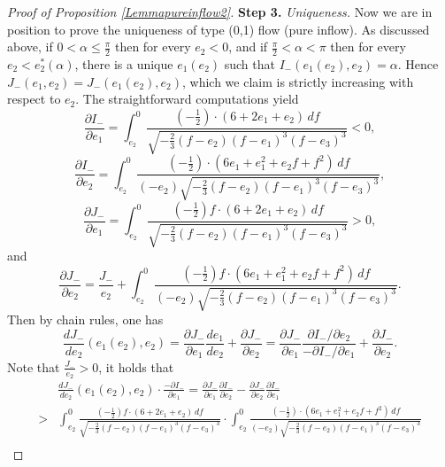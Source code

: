 \documentclass[reqno,12pt]{amsart}
\begin{document}
\begin{proof}[Proof of Proposition \ref{Lemmapureinflow2}]
{\bf Step 3.} {\it Uniqueness.}  Now we are in position to  prove the uniqueness of type (0,1) flow (pure inflow). As discussed above, if $0< \alpha \leq \frac{\pi}{2}$ then for every $e_2<0$, and if $\frac{\pi}{2} < \alpha< \pi$ then for every $e_2<e_2^*(\alpha)$, there is a unique $e_1(e_2)$ such that $I_{-}(e_1(e_2), e_2) = \alpha$. Hence $J_-(e_1,e_2)=J_{-}(e_1(e_2), e_2)$, which we claim is strictly increasing with respect to $e_2$. 
The straightforward computations yield
\begin{equation*}
    \frac{\partial I_{-}}{\partial e_1} = \int_{e_2}^0 \frac{(-\frac12)\cdot  (6+2e_1 +e_2)\, df }{\sqrt{-\frac23(f-e_2) (f-e_1)^3 (f-e_3)^3}} < 0, 
\end{equation*}
\begin{equation*}
    \frac{\partial I_{-}}{\partial e_2} =
    \int_{e_2}^0 \frac{(-\frac12) \cdot (6e_1 + e_1^2 +e_2f+f^2) \, df }{(-e_2) \sqrt{-\frac23(f-e_2) (f-e_1)^3 (f-e_3)^3}}, 
 \end{equation*}
\begin{equation*}
    \frac{\partial J_{-}}{\partial e_1} = \int_{e_2}^0 \frac{(-\frac12) f \cdot  (6+2e_1 +e_2)\, df }{\sqrt{-\frac23(f-e_2) (f-e_1)^3 (f-e_3)^3}} >0,  
\end{equation*}
and
\begin{equation*}
    \frac{\partial J_{-}}{\partial e_2} = \frac{J_{-}}{e_2} + \int_{e_2}^0  \frac{(-\frac12) f \cdot  (6e_1 + e_1^2 + e_2f + f^2)\, df }{(-e_2)\sqrt{-\frac23(f-e_2) (f-e_1)^3 (f-e_3)^3}}. 
\end{equation*}
Then by chain rules, one has
\begin{equation*}
    \frac{d J_{-}  }{d e_2}(e_1(e_2), e_2) = 
    \frac{\partial J_{-}}{\partial e_1} \frac{de_1}{de_2}  + \frac{\partial J_{-}}{\partial e_2} 
    =   \frac{\partial J_{-}}{\partial e_1} \frac{\partial I_{-} / \partial e_2}{- \partial I_{-}/\partial e_1} + \frac{\partial J_{-}}{\partial e_2} .     
\end{equation*}
Note that $\frac{J_{-}}{e_2}>0$, it holds that
\begin{align*}
        & \frac{d J_{-}  }{d e_2} (e_1(e_2), e_2)\cdot \frac{-\partial I_{-}}{\partial e_1} = \frac{\partial J_{-}}{\partial e_1} \frac{\partial I_{-}}{\partial e_2}  - \frac{\partial J_{-}}{\partial e_2}\frac{ \partial I_{-}}{\partial e_1}\\
    > 
    &  \int_{e_2}^0 \frac{(-\frac12) f \cdot  (6+2e_1 +e_2)\, df }{\sqrt{-\frac23(f-e_2) (f-e_1)^3 (f-e_3)^3}} \cdot \int_{e_2}^0 \frac{(-\frac12) \cdot (6e_1 + e_1^2 +e_2f+f^2) \, df }{(-e_2) \sqrt{-\frac23(f-e_2) (f-e_1)^3 (f-e_3)^3}}\\

\end{align*}
\end{proof}
\end{document}
